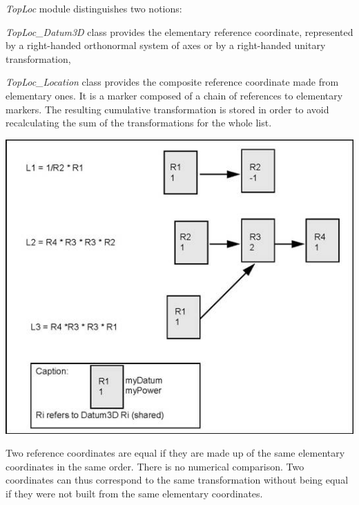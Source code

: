 {\itshape Top\+Loc} module distinguishes two notions\+:
\begin{DoxyItemize}
\item {\itshape Top\+Loc\+\_\+\+Datum3D} class provides the elementary reference coordinate, represented by a right-\/handed orthonormal system of axes or by a right-\/handed unitary transformation,
\item {\itshape Top\+Loc\+\_\+\+Location} class provides the composite reference coordinate made from elementary ones. It is a marker composed of a chain of references to elementary markers. The resulting cumulative transformation is stored in order to avoid recalculating the sum of the transformations for the whole list.
\end{DoxyItemize}


\begin{DoxyImage}
\begin{center}
 \includegraphics[width=\textwidth,height=\textheight/2,keepaspectratio=true]{modeling_data_image005.png}
\end{center}
\caption{Structure of Top\+Loc\+\_\+\+Location}
\end{DoxyImage}


Two reference coordinates are equal if they are made up of the same elementary coordinates in the same order. There is no numerical comparison. Two coordinates can thus correspond to the same transformation without being equal if they were not built from the same elementary coordinates.

